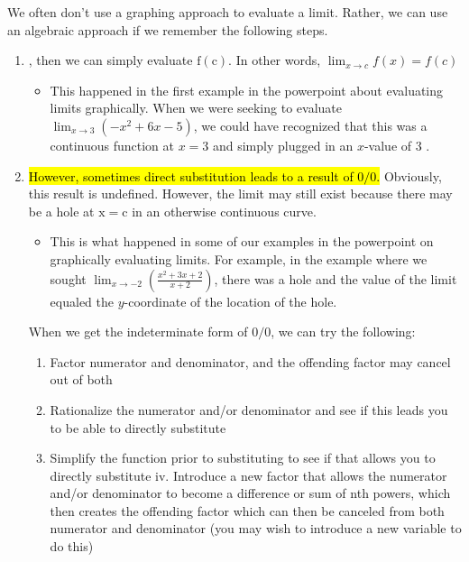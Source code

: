 \documentclass{article}
\begin{document}
We often don't use a graphing approach to evaluate a limit. Rather, we can use an algebraic approach if we remember the following steps. \\
\begin{enumerate}
    \item  {}, then we can simply evaluate $\mathrm{f}(\mathrm{c})$. In other words, $\lim _{x \rightarrow c} f(x)=f(c)$ \\
    \begin{itemize}
        \item This happened in the first example in the powerpoint about evaluating limits graphically. When we were seeking to evaluate $\lim _{x \rightarrow 3}\left(-x^2+6 x-5\right)$, we could have recognized that this was a continuous function at $x=3$ and simply plugged in an $x$-value of 3 .
   \end{itemize}
\item \hl{However, sometimes direct substitution leads to a result of $0 / 0$.} Obviously, this result is undefined. However, the limit may still exist because there may be a hole at $\mathrm{x}=\mathrm{c}$ in an otherwise continuous curve.
\begin{itemize}
    \item This is what happened in some of our examples in the powerpoint on graphically evaluating limits. For example, in the example where we sought $\lim _{x \rightarrow-2}\left(\frac{x^2+3 x+2}{x+2}\right)$, there was a hole and the value of the limit equaled the $y$-coordinate of the location of the hole.
\end{itemize} 
When we get the indeterminate form of $0 / 0$, we can try the following:
\begin{tcolorbox}[colback=Orchid!5!white,colframe=Orchid!75!white,coltitle=white,]
\begin{enumerate}[label=(\roman*)]
    \item Factor numerator and denominator, and the offending factor may cancel out of both
    \item Rationalize the numerator and/or denominator and see if this leads you to be able to directly substitute
    \item Simplify the function prior to substituting to see if that allows you to directly substitute iv. Introduce a new factor that allows the numerator and/or denominator to become a difference or sum of nth powers, which then creates the offending factor which can then be canceled from both numerator and denominator (you may wish to introduce a new variable to do this)
\end{enumerate}
\end{tcolorbox}
\end{enumerate}
\newpage
\end{document}
